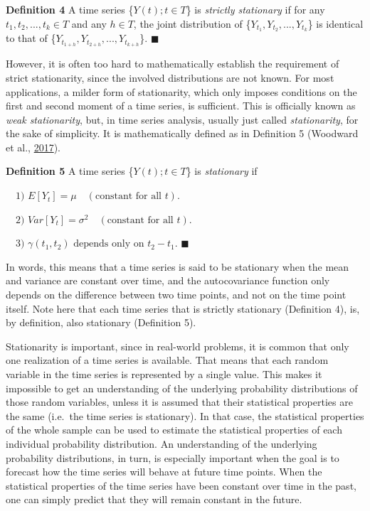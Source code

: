 \documentclass[12pt,oneside]{reedthesis}
\begin{document}
\textbf{Definition 4} A time series \{\(Y(t); t \in T\)\} is
\emph{strictly stationary} if for any \(t_{1}, t_{2}, ..., t_{k} \in T\)
and any \(h \in T\), the joint distribution of
\{\(Y_{t_{1}}, Y_{t_{2}}, ..., Y_{t_{k}}\)\} is identical to that of
\{\(Y_{t_{1+h}}, Y_{t_{2+h}}, ..., Y_{t_{k+h}}\)\}. \(\blacksquare\)

However, it is often too hard to mathematically establish the
requirement of strict stationarity, since the involved distributions are
not known. For most applications, a milder form of stationarity, which
only imposes conditions on the first and second moment of a time series,
is sufficient. This is officially known as \emph{weak stationarity},
but, in time series analysis, usually just called \emph{stationarity},
for the sake of simplicity. It is mathematically defined as in
Definition 5 (Woodward et al.,
\protect\hyperlink{ref-woodward2017}{2017}).

\textbf{Definition 5} A time series \{\(Y(t); t \in T\)\} is
\emph{stationary} if

\(\quad \text{1) } E[Y_{t}] = \mu \quad (\text{constant for all }t)\).

\(\quad \text{2) } Var[Y_{t}] = \sigma^{2} \quad (\text{constant for all }t)\).

\(\quad \text{3) } \gamma(t_{1}, t_{2}) \text{ depends only on } t_{2} - t_{1}\).
\(\blacksquare\)

In words, this means that a time series is said to be stationary when
the mean and variance are constant over time, and the autocovariance
function only depends on the difference between two time points, and not
on the time point itself. Note here that each time series that is
strictly stationary (Definition 4), is, by definition, also stationary
(Definition 5).

Stationarity is important, since in real-world problems, it is common
that only one realization of a time series is available. That means that
each random variable in the time series is represented by a single
value. This makes it impossible to get an understanding of the
underlying probability distributions of those random variables, unless
it is assumed that their statistical properties are the same (i.e.~the
time series is stationary). In that case, the statistical properties of
the whole sample can be used to estimate the statistical properties of
each individual probability distribution. An understanding of the
underlying probability distributions, in turn, is especially important
when the goal is to forecast how the time series will behave at future
time points. When the statistical properties of the time series have
been constant over time in the past, one can simply predict that they
will remain constant in the future.
\end{document}
